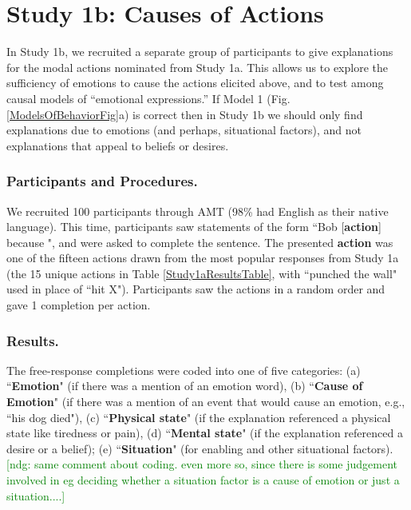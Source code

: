 \documentclass[10pt,letterpaper]{article}
\newcommand{\ndg}[1]{\textcolor{Green}{[ndg: #1]}}
\begin{document}
\section{Study 1b: Causes of Actions}

In Study 1b, we recruited a separate group of participants to give explanations for the modal actions nominated from Study 1a. 
This allows us to explore the sufficiency of emotions to cause the actions elicited above, and to test among causal models of ``emotional expressions.''
If Model 1 (Fig. \ref{ModelsOfBehaviorFig}a) is correct then in Study 1b we should only find explanations due to emotions (and perhaps, situational factors), and not explanations that appeal to beliefs or desires.


\subsubsection{Participants and Procedures.} 
We recruited 100 participants through AMT (98\% had English as their native language). This time, participants saw statements of the form ``Bob [\textbf{action}] because \underline{\hspace{2em}}", and were asked to complete the sentence. The presented \textbf{action} was one of the fifteen actions drawn from the most popular responses from Study 1a (the 15 unique actions in Table \ref{Study1aResultsTable}, with ``punched the wall" used in place of ``hit X"). Participants saw the actions in a random order and gave 1 completion per action.

\subsubsection{Results.} 
The free-response completions were coded into one of five categories: (a) ``\textbf{Emotion}" (if there was a mention of an emotion word), (b) ``\textbf{Cause of Emotion}" (if there was a mention of an event that would cause an emotion, e.g., ``his dog died"), (c) ``\textbf{Physical state}" (if the explanation referenced a physical state like tiredness or pain), (d) ``\textbf{Mental state}" (if the explanation referenced a desire or a belief); (e) ``\textbf{Situation}" (for enabling and other situational factors). 
\ndg{same comment about coding. even more so, since there is some judgement involved in eg deciding whether a situation factor is a cause of emotion or just a situation....}
\end{document}
